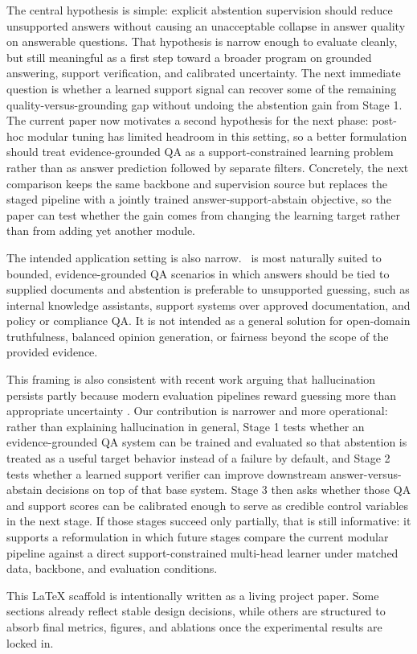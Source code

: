 The central hypothesis is simple:
explicit abstention supervision should reduce unsupported answers without
causing an unacceptable collapse in answer quality on answerable questions.
That hypothesis is narrow enough to evaluate cleanly, but still meaningful as a
first step toward a broader program on grounded answering, support verification,
and calibrated uncertainty.
The next immediate question is whether a learned support signal can recover some
of the remaining quality-versus-grounding gap without undoing the abstention
gain from Stage 1.
The current paper now motivates a second hypothesis for the next phase:
post-hoc modular tuning has limited headroom in this setting, so a better
formulation should treat evidence-grounded QA as a support-constrained learning
problem rather than as answer prediction followed by separate filters.
Concretely, the next comparison keeps the same backbone and supervision source
but replaces the staged pipeline with a jointly trained answer-support-abstain
objective, so the paper can test whether the gain comes from changing the
learning target rather than from adding yet another module.

The intended application setting is also narrow.
\system\ is most naturally suited to bounded, evidence-grounded QA scenarios in
which answers should be tied to supplied documents and abstention is preferable
to unsupported guessing, such as internal knowledge assistants, support systems
over approved documentation, and policy or compliance QA.
It is not intended as a general solution for open-domain truthfulness, balanced
opinion generation, or fairness beyond the scope of the provided evidence.

This framing is also consistent with recent work arguing that hallucination
persists partly because modern evaluation pipelines reward guessing more than
appropriate uncertainty \citep{kalai2025why}.
Our contribution is narrower and more operational:
rather than explaining hallucination in general, Stage 1 tests whether an
evidence-grounded QA system can be trained and evaluated so that abstention is
treated as a useful target behavior instead of a failure by default, and
Stage 2 tests whether a learned support verifier can improve downstream
answer-versus-abstain decisions on top of that base system.
Stage 3 then asks whether those QA and support scores can be calibrated enough
to serve as credible control variables in the next stage.
If those stages succeed only partially, that is still informative:
it supports a reformulation in which future stages compare the current modular
pipeline against a direct support-constrained multi-head learner under matched
data, backbone, and evaluation conditions.

This LaTeX scaffold is intentionally written as a living project paper.
Some sections already reflect stable design decisions, while others are
structured to absorb final metrics, figures, and ablations once the
experimental results are locked in.
